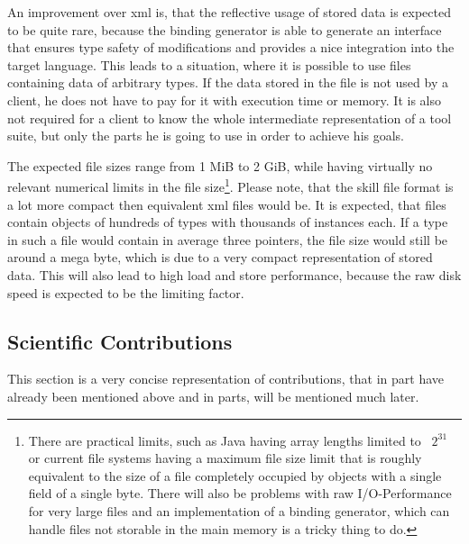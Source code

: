 An improvement over \gls{xml} is, that the reflective usage of stored data is expected to be quite rare, because the binding generator is able to generate an interface that ensures type safety of modifications and provides a nice integration into the target language. This leads to a situation, where it is possible to use files containing data of arbitrary types. If the data stored in the file is not used by a client, he does not have to pay for it with execution time or memory. It is also not required for a client to know the whole intermediate representation of a tool suite, but only the parts he is going to use in order to achieve his goals.

The expected file sizes range from 1 MiB to 2 GiB, while having virtually no relevant numerical limits in the file size\footnote{There are practical limits, such as Java having array lengths limited to ~$2^{31}$ or current file systems having a maximum file size limit that is roughly equivalent to the size of a file completely occupied by objects with a single field of a single byte. There will also be problems with raw I/O-Performance for very large files and an implementation of a binding generator, which can handle files not storable in the main memory is a tricky thing to do.}. Please note, that the skill file format is a lot more compact then equivalent \gls{xml} files would be.
It is expected, that files contain objects of hundreds of types with thousands of instances each. If a type in such a file would contain in average three pointers, the file size would still be around a mega byte, which is due to a very compact representation of stored data. This will also lead to high load and store performance, because the raw disk speed is expected to be the limiting factor.


\subsection{Scientific Contributions}

This section is a very concise representation of contributions, that in part have already been mentioned above and in parts, will be mentioned much later.

